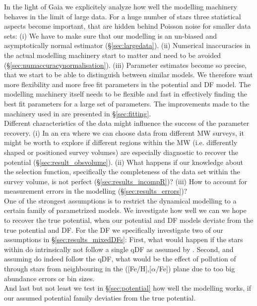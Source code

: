 In the light of Gaia we explicitely analyze how well the modelling machinery behaves in the limit of large data. For a huge number of stars three statistical aspects become important, that are  hidden behind Poisson noise for smaller data sets: (i) We have to make sure that our modelling is an un-biased and asymptotically normal estimator (\S\ref{sec:largedata}). (ii) Numerical inaccuracies in the actual modelling machinery start to matter and need to be avoided (\S\ref{sec:numaccuracynormalisation}). (iii) Parameter estimates become so precise, that we start to be able to distinguish between similar models. We therefore want more flexibility and more free fit parameters in the potential and DF model. The modelling machinery itself needs to be flexible and fast in effectively finding the best fit parameters for a large set of parameters. The improvements made to the machinery used in \cite{bov13} are presented in \S\ref{sec:fitting}. \\

Different characteristics of the data might influence the success of the parameter recovery. (i) In an era where we can choose data from different MW surveys, it might be worth to explore if different regions within the MW (i.e. differently shaped or positioned survey volumes) are especially diagnostic to recover the potential (\S\ref{sec:result_obsvolume}). (ii) What happens if our knowledge about the selection function, specifically the completeness of the data set within the survey volume, is not perfect (\S\ref{sec:results_incompR})? (iii) How to account for measurement errors in the modelling (\S\ref{sec:results_errors})? \\

One of the strongest assumptions is to restrict the dynamical modelling to a certain family of parametrized models. We investigate how well we can we hope to recover the true potential, when our potential and DF models deviate from the true potential and DF. For the DF we specifically investigate two of our assumptions in \S\ref{sec:results_mixedDFs}: First, what would happen if the stars within \MAPs do intrinsically not follow a single qDF as assumed by \cite{tin13,bov13}. Second, and assuming \MAPs do indeed follow the qDF, what would be the effect of pollution of \MAPs through stars from neighbouring \MAPs in the ([Fe/H],[$\alpha$/Fe]) plane due to too big abundance errors or bin sizes.\\
And last but not least we test in \S\ref{sec:potential} how well the modelling works, if our assumed potential family deviaties from the true potential. \\

